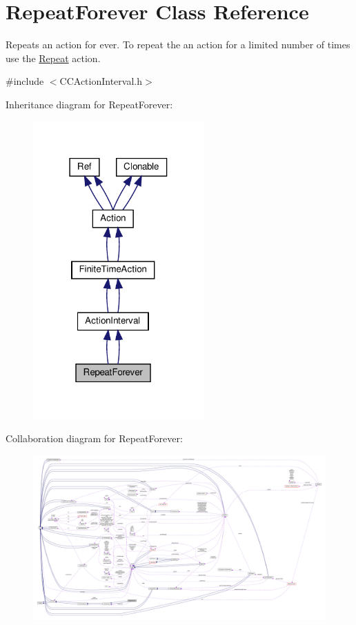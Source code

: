 \hypertarget{classRepeatForever}{}\section{Repeat\+Forever Class Reference}
\label{classRepeatForever}


Repeats an action for ever. To repeat the an action for a limited number of times use the \hyperlink{classRepeat}{Repeat} action.  




{\ttfamily \#include $<$C\+C\+Action\+Interval.\+h$>$}



Inheritance diagram for Repeat\+Forever\+:
\nopagebreak
\begin{figure}[H]
\begin{center}
\leavevmode
\includegraphics[width=186pt]{classRepeatForever__inherit__graph}
\end{center}
\end{figure}


Collaboration diagram for Repeat\+Forever\+:
\nopagebreak
\begin{figure}[H]
\begin{center}
\leavevmode
\includegraphics[width=350pt]{classRepeatForever__coll__graph}
\end{center}
\end{figure}
